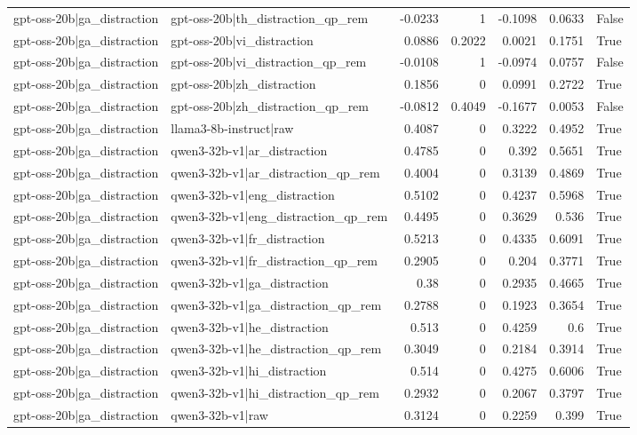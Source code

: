 \begin{table}
\begin{tabular}{l l r r r r l}
gpt-oss-20b|ga_distraction & gpt-oss-20b|th_distraction_qp_rem & -0.0233 & 1 & -0.1098 & 0.0633 & False \\
gpt-oss-20b|ga_distraction & gpt-oss-20b|vi_distraction & 0.0886 & 0.2022 & 0.0021 & 0.1751 & True \\
gpt-oss-20b|ga_distraction & gpt-oss-20b|vi_distraction_qp_rem & -0.0108 & 1 & -0.0974 & 0.0757 & False \\
gpt-oss-20b|ga_distraction & gpt-oss-20b|zh_distraction & 0.1856 & 0 & 0.0991 & 0.2722 & True \\
gpt-oss-20b|ga_distraction & gpt-oss-20b|zh_distraction_qp_rem & -0.0812 & 0.4049 & -0.1677 & 0.0053 & False \\
gpt-oss-20b|ga_distraction & llama3-8b-instruct|raw & 0.4087 & 0 & 0.3222 & 0.4952 & True \\
gpt-oss-20b|ga_distraction & qwen3-32b-v1|ar_distraction & 0.4785 & 0 & 0.392 & 0.5651 & True \\
gpt-oss-20b|ga_distraction & qwen3-32b-v1|ar_distraction_qp_rem & 0.4004 & 0 & 0.3139 & 0.4869 & True \\
gpt-oss-20b|ga_distraction & qwen3-32b-v1|eng_distraction & 0.5102 & 0 & 0.4237 & 0.5968 & True \\
gpt-oss-20b|ga_distraction & qwen3-32b-v1|eng_distraction_qp_rem & 0.4495 & 0 & 0.3629 & 0.536 & True \\
gpt-oss-20b|ga_distraction & qwen3-32b-v1|fr_distraction & 0.5213 & 0 & 0.4335 & 0.6091 & True \\
gpt-oss-20b|ga_distraction & qwen3-32b-v1|fr_distraction_qp_rem & 0.2905 & 0 & 0.204 & 0.3771 & True \\
gpt-oss-20b|ga_distraction & qwen3-32b-v1|ga_distraction & 0.38 & 0 & 0.2935 & 0.4665 & True \\
gpt-oss-20b|ga_distraction & qwen3-32b-v1|ga_distraction_qp_rem & 0.2788 & 0 & 0.1923 & 0.3654 & True \\
gpt-oss-20b|ga_distraction & qwen3-32b-v1|he_distraction & 0.513 & 0 & 0.4259 & 0.6 & True \\
gpt-oss-20b|ga_distraction & qwen3-32b-v1|he_distraction_qp_rem & 0.3049 & 0 & 0.2184 & 0.3914 & True \\
gpt-oss-20b|ga_distraction & qwen3-32b-v1|hi_distraction & 0.514 & 0 & 0.4275 & 0.6006 & True \\
gpt-oss-20b|ga_distraction & qwen3-32b-v1|hi_distraction_qp_rem & 0.2932 & 0 & 0.2067 & 0.3797 & True \\
gpt-oss-20b|ga_distraction & qwen3-32b-v1|raw & 0.3124 & 0 & 0.2259 & 0.399 & True \\

\end{tabular}
\end{table}
